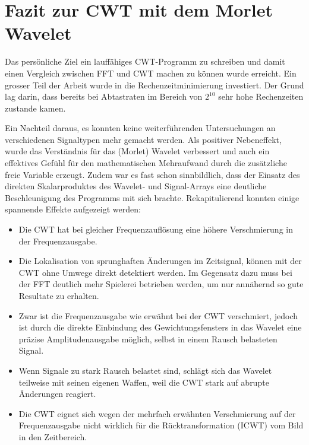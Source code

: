 %
%
%
%
\section{Fazit zur CWT mit dem Morlet Wavelet
	\label{wavelets:section:teil6}}

Das persönliche Ziel ein lauffähiges CWT-Programm zu schreiben und damit einen Vergleich zwischen FFT und CWT machen zu können wurde erreicht. Ein grosser Teil der Arbeit wurde in die Rechenzeitminimierung investiert. Der Grund lag darin, dass bereits bei Abtastraten im Bereich von $2^10$ sehr hohe Rechenzeiten zustande kamen.

Ein Nachteil daraus, es konnten keine weiterführenden Untersuchungen an verschiedenen Signaltypen mehr gemacht werden. Als positiver Nebeneffekt, wurde das Verständnis für das (Morlet) Wavelet verbessert und auch ein effektives Gefühl für den mathematischen Mehraufwand durch die zusätzliche freie Variable erzeugt. Zudem war es fast schon sinnbildlich, dass der Einsatz des direkten Skalarproduktes des Wavelet- und Signal-Arrays eine deutliche Beschleunigung des Programms mit sich brachte. 
Rekapitulierend konnten einige spannende Effekte aufgezeigt werden:

\begin{itemize}
	\item Die CWT hat bei gleicher Frequenzauflösung eine höhere Verschmierung in der Frequenzausgabe.
	\item Die Lokalisation von sprunghaften Änderungen im Zeitsignal, können mit der CWT ohne Umwege direkt detektiert werden. Im Gegensatz dazu muss bei der FFT deutlich mehr Spielerei betrieben werden, um nur annähernd so gute Resultate zu erhalten.
	\item Zwar ist die Frequenzausgabe wie erwähnt bei der CWT verschmiert, jedoch ist durch die direkte Einbindung des Gewichtungsfensters in das Wavelet eine präzise Amplitudenausgabe möglich, selbst in einem Rausch belasteten Signal.
	\item Wenn Signale zu stark Rausch belastet sind, schlägt sich das Wavelet teilweise mit seinen eigenen Waffen, weil die CWT stark auf abrupte Änderungen reagiert.
	\item Die CWT eignet sich wegen der mehrfach erwähnten Verschmierung auf der Frequenzausgabe nicht wirklich für die Rücktransformation (ICWT) vom Bild in den Zeitbereich.
\end{itemize}
